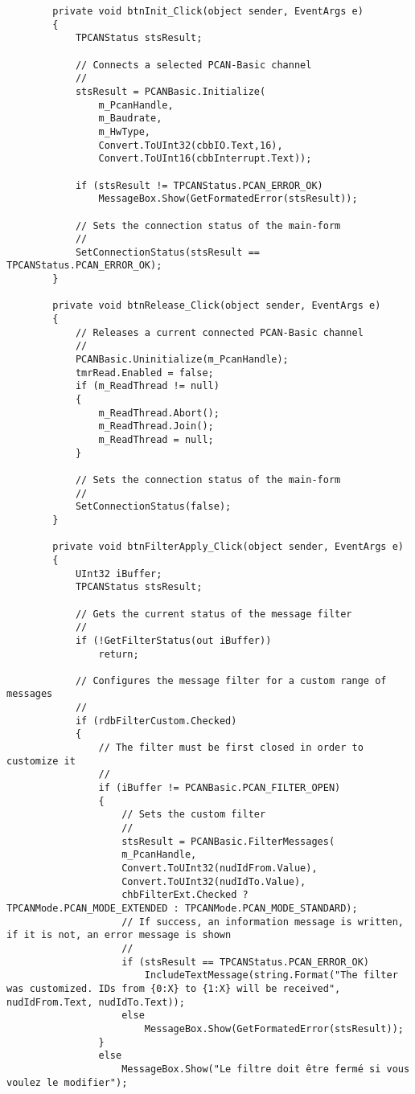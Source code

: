 \begin{lstlisting}
        private void btnInit_Click(object sender, EventArgs e)
        {
            TPCANStatus stsResult;

            // Connects a selected PCAN-Basic channel
            //
            stsResult = PCANBasic.Initialize(
                m_PcanHandle,
                m_Baudrate,
                m_HwType,
                Convert.ToUInt32(cbbIO.Text,16),
                Convert.ToUInt16(cbbInterrupt.Text));

            if (stsResult != TPCANStatus.PCAN_ERROR_OK)
                MessageBox.Show(GetFormatedError(stsResult));

            // Sets the connection status of the main-form
            //
            SetConnectionStatus(stsResult == TPCANStatus.PCAN_ERROR_OK);
        }

        private void btnRelease_Click(object sender, EventArgs e)
        {
            // Releases a current connected PCAN-Basic channel
            //
            PCANBasic.Uninitialize(m_PcanHandle);
            tmrRead.Enabled = false;
            if (m_ReadThread != null)
            {
                m_ReadThread.Abort();
                m_ReadThread.Join();
                m_ReadThread = null;
            }

            // Sets the connection status of the main-form
            //
            SetConnectionStatus(false);
        }

        private void btnFilterApply_Click(object sender, EventArgs e)
        {
            UInt32 iBuffer;
            TPCANStatus stsResult;

            // Gets the current status of the message filter
            //
            if (!GetFilterStatus(out iBuffer))
                return;

            // Configures the message filter for a custom range of messages
            //
            if (rdbFilterCustom.Checked)
            {
                // The filter must be first closed in order to customize it
                //
                if (iBuffer != PCANBasic.PCAN_FILTER_OPEN)
                {
                    // Sets the custom filter
                    //
                    stsResult = PCANBasic.FilterMessages(
                    m_PcanHandle,
                    Convert.ToUInt32(nudIdFrom.Value),
                    Convert.ToUInt32(nudIdTo.Value),
                    chbFilterExt.Checked ? TPCANMode.PCAN_MODE_EXTENDED : TPCANMode.PCAN_MODE_STANDARD);
                    // If success, an information message is written, if it is not, an error message is shown
                    //
                    if (stsResult == TPCANStatus.PCAN_ERROR_OK)
                        IncludeTextMessage(string.Format("The filter was customized. IDs from {0:X} to {1:X} will be received", nudIdFrom.Text, nudIdTo.Text));
                    else
                        MessageBox.Show(GetFormatedError(stsResult));
                }
                else
                    MessageBox.Show("Le filtre doit être fermé si vous voulez le modifier");


\end{lstlisting}

